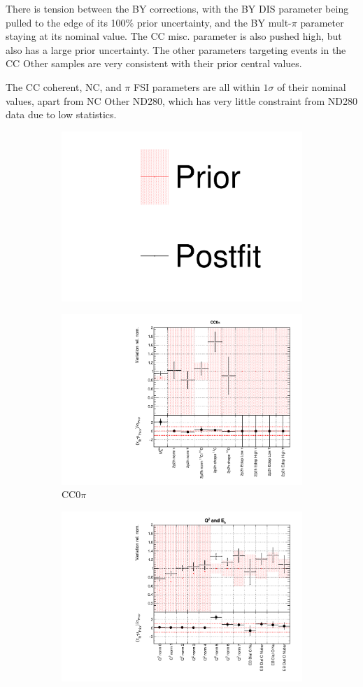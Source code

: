 There is tension between the BY corrections, with the BY DIS parameter being pulled to the edge of its 100$\%$ prior uncertainty, and the BY mult-$\pi$ parameter staying at its nominal value. The CC misc. parameter is also pushed high, but also has a large prior uncertainty. The other parameters targeting events in the CC Other samples are very consistent with their prior central values. 

The CC coherent, NC, and $\pi$ FSI parameters are all within $1\sigma$ of their nominal values, apart from NC Other ND280, which has very little constraint from ND280 data due to low statistics. 

\begin{figure}
\centering
\begin{subfigure}{0.95\textwidth}
  \centering
  \includegraphics[width=0.25\linewidth]{figs/dat_leg}
\end{subfigure}
\begin{subfigure}{0.49\textwidth}
  \centering
  \includegraphics[width=0.95\linewidth]{figs/datxsec1}
  \caption{CC0$\pi$}
  \label{fig:}
\end{subfigure}
\begin{subfigure}{0.49\textwidth}
  \centering
  \includegraphics[width=0.95\linewidth]{figs/datxsec2}

\end{subfigure}
\end{figure}
